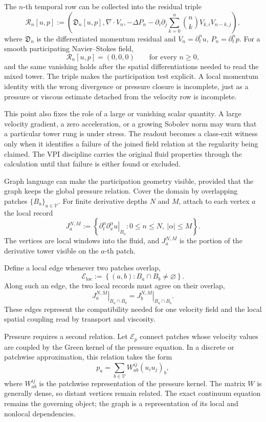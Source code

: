 The \(n\)-th temporal row can be collected into the residual triple
\[
  \mathscr R_n[u,p]
  :=
  \left(
    \mathfrak D_n[u,p],
    \nabla\cdot V_n,
    -\Delta P_n
    -
    \partial_i\partial_j
    \sum_{k=0}^{n}
    \binom{n}{k}
    V_{k,i}V_{n-k,j}
  \right),
\]
where \(\mathfrak D_n\) is the differentiated momentum residual and \(V_n=\partial_t^nu\), \(P_n=\partial_t^np\).
For a smooth participating Navier--Stokes field,
\[
  \mathscr R_n[u,p]=(0,0,0)
  \qquad
  \text{for every }n\geq0,
\]
and the same vanishing holds after the spatial differentiations needed to read the mixed tower.
The triple makes the participation test explicit.
A local momentum identity with the wrong divergence or pressure closure is incomplete, just as a pressure or viscous estimate detached from the velocity row is incomplete.

This point also fixes the role of a large or vanishing scalar quantity.
A large velocity gradient, a zero acceleration, or a growing Sobolev norm may warn that a particular tower rung is under stress.
The readout becomes a class-exit witness only when it identifies a failure of the joined field relation at the regularity being claimed.
The VPI discipline carries the original fluid properties through the calculation until that failure is either found or excluded.


Graph language can make the participation geometry visible, provided that the graph keeps the global pressure relation.
Cover the domain by overlapping patches \(\{B_a\}_{a\in\mathcal V}\).
For finite derivative depths \(N\) and \(M\), attach to each vertex \(a\) the local record
\[
  J_a^{N,M}
  :=
  \left\{
    \left.
    \partial_t^n\partial_x^\alpha u
    \right|_{B_a}
    :
    0\leq n\leq N,\ 
    |\alpha|\leq M
  \right\}.
\]
The vertices are local windows into the fluid, and \(J_a^{N,M}\) is the portion of the derivative tower visible on the \(a\)-th patch.

Define a local edge whenever two patches overlap,
\[
  \mathcal E_{\mathrm{loc}}
  :=
  \left\{
    (a,b):
    B_a\cap B_b\neq\varnothing
  \right\}.
\]
Along such an edge, the two local records must agree on their overlap,
\[
  \left.
  J_a^{N,M}
  \right|_{B_a\cap B_b}
  =
  \left.
  J_b^{N,M}
  \right|_{B_a\cap B_b}.
\]
These edges represent the compatibility needed for one velocity field and the local spatial coupling read by transport and viscosity.

Pressure requires a second relation.
Let \(\mathcal E_p\) connect patches whose velocity values are coupled by the Green kernel of the pressure equation.
In a discrete or patchwise approximation, this relation takes the form
\[
  p_a
  =
  \sum_{b\in\mathcal V}
  W_{ab}^{ij}
  (u_i u_j)_b,
\]
where \(W_{ab}^{ij}\) is the patchwise representation of the pressure kernel.
The matrix \(W\) is generally dense, so distant vertices remain related.
The exact continuum equation remains the governing object; the graph is a representation of its local and nonlocal dependencies.

